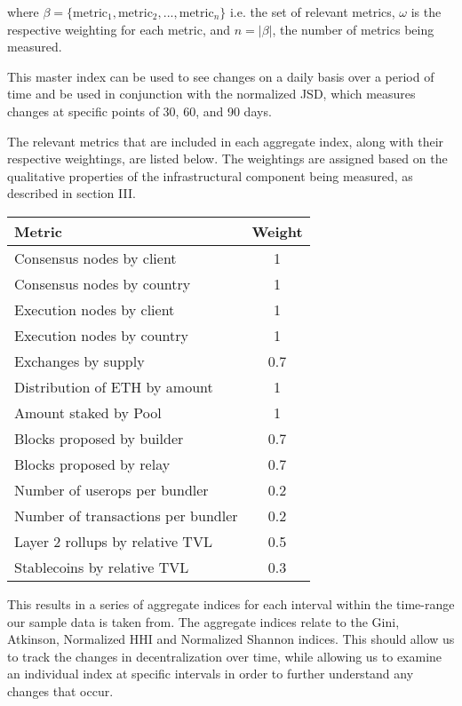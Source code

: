\documentclass[conference]{IEEEtran}
\begin{document}
\vspace{8pt}

where \(\beta=\{\text{metric}_1, \text{metric}_2, ..., \text{metric}_n\}\) i.e. the set of relevant metrics, $\omega$ is the respective weighting for each metric, and $n=\left| \beta \right|$, the number of metrics being measured.

This master index can be used to see changes on a daily basis over a period of time and be used in conjunction with the normalized JSD, which measures changes at specific points of 30, 60, and 90 days.

The relevant metrics that are included in each aggregate index, along with their respective weightings, are listed below. The weightings are assigned based on the qualitative properties of the infrastructural component being measured, as described in section III.

\vspace{12pt}
\begin{table}[h]
\normalsize
\begin{center}
\begin{tabular}{|l|c|}
\hline
\textbf{Metric} & \textbf{Weight} \\ \hline
Consensus nodes by client & 1 \\ \hline
Consensus nodes by country & 1 \\ \hline
Execution nodes by client & 1 \\ \hline
Execution nodes by country & 1 \\ \hline
Exchanges by supply & 0.7 \\ \hline
Distribution of ETH by amount & 1 \\ \hline
Amount staked by Pool & 1 \\ \hline
Blocks proposed by builder & 0.7 \\ \hline
Blocks proposed by relay & 0.7 \\ \hline
Number of userops per bundler & 0.2 \\ \hline
Number of transactions per bundler & 0.2 \\ \hline
Layer 2 rollups by relative TVL & 0.5 \\ \hline
Stablecoins by relative TVL & 0.3 \\ \hline
\end{tabular}
\end{center}
\end{table}
This results in a series of aggregate indices for each interval within the time-range our sample data is taken from.  The aggregate indices relate to the Gini, Atkinson, Normalized HHI and Normalized Shannon indices.  This should allow us to track the changes in decentralization over time, while allowing us to examine an individual index at specific intervals in order to further understand any changes that occur.
\end{document}
